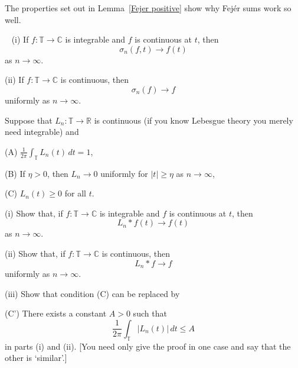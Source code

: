 The properties set out in Lemma~\ref{Fejer positive}
show why Fej\'{e}r sums work so well.

\begin{theorem}~\label{Fejer convergence}
(i) If $f:{\mathbb T}\rightarrow{\mathbb C}$
is integrable and $f$ is continuous at $t$, then
\[\sigma_{n}(f,t)\rightarrow f(t)\]
as $n\rightarrow\infty$.

(ii) If $f:{\mathbb T}\rightarrow{\mathbb C}$
is continuous, then
\[\sigma_{n}(f)\rightarrow f\]
uniformly as $n\rightarrow\infty$.
\end{theorem}
\begin{exercise} Suppose that
$L_{n}:{\mathbb T}\rightarrow{\mathbb R}$
is continuous (if you know Lebesgue theory you
merely need integrable) and

(A) ${\displaystyle \frac{1}{2\pi}\int_{\mathbb T}L_{n}(t)\, dt=1}$,

(B) If $\eta>0$, then $L_{n}\rightarrow 0$ uniformly
for $|t|\geq \eta$
as $n\rightarrow\infty$,

(C) $L_{n}(t)\geq 0$ for all $t$.

(i) Show that, if $f:{\mathbb T}\rightarrow{\mathbb C}$
is integrable and $f$ is continuous at $t$, then
\[L_{n}*f(t)\rightarrow f(t)\]
as $n\rightarrow\infty$.

(ii) Show that, if $f:{\mathbb T}\rightarrow{\mathbb C}$
is continuous, then
\[L_{n}*f\rightarrow f\]
uniformly as $n\rightarrow\infty$.

(iii) Show that condition (C) can be replaced by

(C') There exists a constant $A>0$ such that
\[\frac{1}{2\pi}\int_{\mathbb T}|L_{n}(t)|\, dt\leq A\]
in parts (i) and (ii). [You need only give the proof in
one case and say that the other is `similar'.]
\end{exercise}
